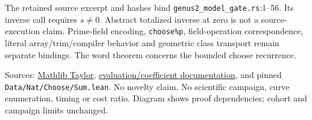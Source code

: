 \documentclass[10pt]{article}
\begin{document}
The retained source excerpt and hashes bind \texttt{genus2\_model\_gate.rs}:1--56. Its inverse call requires $s\ne0$. Abstract totalized inverse at zero is not a source-execution claim. Prime-field encoding, \texttt{choose\%p}, field-operation correspondence, literal array/trim/compiler behavior and geometric class transport remain separate bindings. The word theorem concerns the bounded choose recurrence.

Sources: \href{https://leanprover-community.github.io/mathlib4_docs/Mathlib/Algebra/Polynomial/Taylor.html}{Mathlib Taylor}, \href{https://leanprover-community.github.io/mathlib4_docs/Mathlib/Algebra/Polynomial/Eval/Coeff.html}{evaluation/coefficient documentation}, and pinned \texttt{Data/Nat/Choose/Sum.lean}. No novelty claim. No scientific campaign, curve enumeration, timing or cost ratio. Diagram shows proof dependencies; cohort and campaign limits unchanged.
\end{document}
